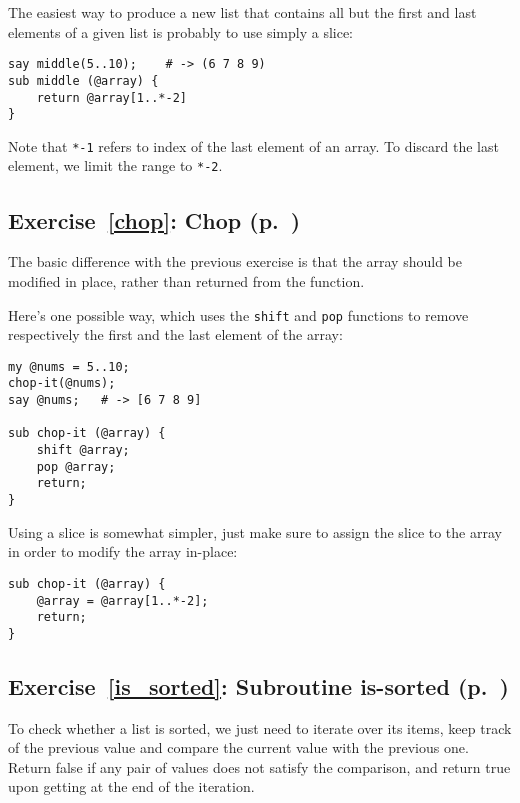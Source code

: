 The easiest way to produce a new list that contains 
all but the first and last elements of a given list 
is probably to use simply a slice:

\begin{verbatim}
say middle(5..10);    # -> (6 7 8 9)
sub middle (@array) { 
    return @array[1..*-2] 
}
\end{verbatim}

Note that \verb'*-1' refers to index of the last element 
of an array. To discard the last element, we limit the 
range to \verb'*-2'.

\subsection{Exercise~\ref{chop}: Chop (p.~\pageref{chop})}
\label{sol_chop}

The basic difference with the previous exercise is that 
the array should be modified in place, rather than 
returned from the function.

Here's one possible way, which uses the {\tt shift} and 
{\tt pop} functions to remove respectively the first 
and the last element of the array:

\begin{verbatim}
my @nums = 5..10;
chop-it(@nums); 
say @nums;   # -> [6 7 8 9]

sub chop-it (@array) { 
    shift @array; 
    pop @array; 
    return;
}
\end{verbatim}

Using a slice is somewhat simpler, just make sure to 
assign the slice to the array in order to modify the 
array in-place:

\begin{verbatim}
sub chop-it (@array) { 
    @array = @array[1..*-2];
    return;
}
\end{verbatim}
%

\subsection{Exercise~\ref{is_sorted}: Subroutine is-sorted (p.~\pageref{is_sorted})}
\label{sol_is_sorted}

To check whether a list is sorted, we just need to iterate 
over its items, keep track of the previous value and compare 
the current value with the previous one. Return false if 
any pair of values does not satisfy the comparison, and 
return true upon getting at the end of the iteration.

